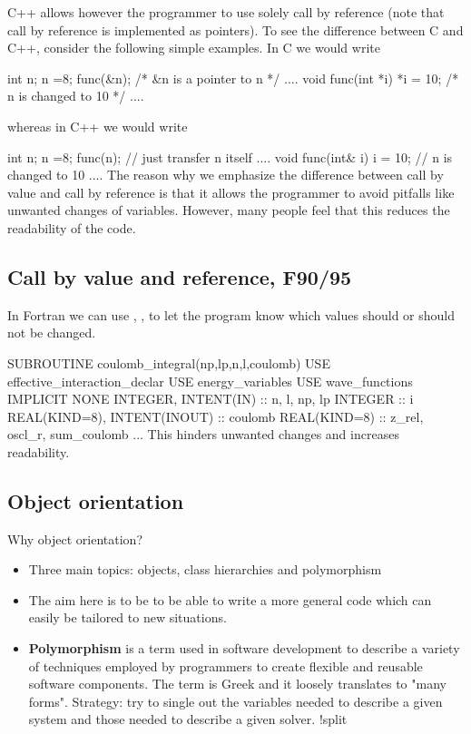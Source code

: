 \documentclass[%
twoside,                 %
final,                   %
10pt]{article}
\begin{document}
{{{{{C++ allows however the programmer to use solely call by reference
(note that call by reference is implemented as pointers).
To see the difference between C and C++, consider the following simple
examples. In C we would write

\bcppcod
   int n; n =8;
   func(&n); /* &n is a pointer to n */
   ....
   void func(int *i)
   {
     *i = 10; /* n is changed to 10 */
     ....
   }
\ecppcod

whereas in C++ we would write

\bcppcod
   int n; n =8;
   func(n); // just transfer n itself
   ....
   void func(int& i)
   {
     i = 10; // n is changed to 10
     ....
   }
\ecppcod
The reason why we emphasize the difference between call by value and call
by reference is that it allows the programmer to avoid pitfalls
like unwanted changes of variables. However, many people feel that this
reduces the readability of the code.


\subsection{Call by value and reference, F90/95}

In Fortran we can use , ,  to let the
program know which values should or should not be changed.

\bfcod
SUBROUTINE coulomb_integral(np,lp,n,l,coulomb)
  USE effective_interaction_declar
  USE energy_variables
  USE wave_functions
  IMPLICIT NONE
  INTEGER, INTENT(IN)  :: n, l, np, lp
  INTEGER :: i
  REAL(KIND=8), INTENT(INOUT) :: coulomb
  REAL(KIND=8) :: z_rel, oscl_r, sum_coulomb
  ...
\efcod
This hinders unwanted changes and increases readability.



\subsection{Object orientation}

Why object orientation?

\begin{itemize}
  \item Three main topics: objects, class hierarchies and polymorphism

  \item The aim here is to be to be able to write a more general code which can easily be tailored to new situations.

  \item {\bf Polymorphism} is a term used in software development to describe a variety of techniques employed by programmers to create flexible and reusable software components. The term is Greek and it loosely translates to "many forms". Strategy: try to single out the variables needed to describe a given system and those needed to describe a given solver. !split
\end{itemize}

}}}}}
\end{document}
